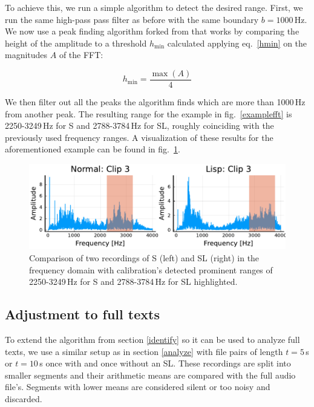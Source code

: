 \documentclass{IEEEtran}
\begin{document}
To achieve this,
we run a simple algorithm to detect the desired range.
First, we run the same high-pass pass filter as before with the same boundary \(b = 1000\)\,Hz.
We now use a peak finding algorithm forked from \cite{findpeaks} that works by comparing the height of the amplitude to a threshold \(h_\mathrm{min}\) calculated applying eq.\ \ref{hmin} on the magnitudes \(A\) of the FFT:

\begin{equation}
h_\mathrm{min} = \frac{\max(A)}{4}
\label{hmin}
\end{equation}

We then filter out all the peaks the algorithm finds which are more than 1000\,Hz from another peak.
The resulting range for the example in fig.\ \ref{examplefft} is 2250-3249\,Hz for S and 2788-3784\,Hz for SL,
roughly coinciding with the previously used frequency ranges.
A visualization of these results for the aforementioned example can be found in fig.\ \ref{examplecalibration}.

\begin{figure}[h]
\centering
\includegraphics[scale=0.55]{calibration.pdf}
\caption{Comparison of two recordings of S (left) and SL (right) in the frequency domain with calibration's detected prominent ranges of 2250-3249\,Hz for S and 2788-3784\,Hz for SL highlighted.}\label{examplecalibration}
\end{figure}

\subsection{Adjustment to full texts}\label{texts}

To extend the algorithm from section \ref{identify} so it can be used to analyze full texts,
we use a similar setup as in section \ref{analyze} with file pairs of length \(t = 5\)\,s or \(t = 10\)\,s once with and once without an SL.
These recordings are split into smaller segments and their arithmetic means are compared with the full audio file's.
Segments with lower means are considered silent or too noisy and discarded.
\end{document}
